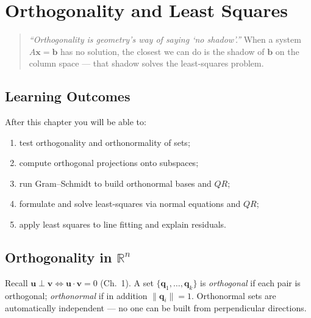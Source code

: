 \chapter{Orthogonality and Least Squares}
\label{ch:orthogonality}

\begin{quote}
\emph{``Orthogonality is geometry's way of saying `no shadow'.''} When a system $A\mathbf{x}=\mathbf{b}$ has no solution, the closest we can do is the shadow of $\mathbf{b}$ on the column space --- that shadow solves the least-squares problem.
\end{quote}

\noindent{}
\vspace{0.4em}

\section*{Learning Outcomes}
After this chapter you will be able to:
\begin{enumerate}[label=(L\arabic*)]
    \item test orthogonality and orthonormality of sets;
    \item compute orthogonal projections onto subspaces;
    \item run Gram--Schmidt to build orthonormal bases and $QR$;
    \item formulate and solve least-squares via normal equations and $QR$;
    \item apply least squares to line fitting and explain residuals.
\end{enumerate}

\section{Orthogonality in \texorpdfstring{$\mathbb{R}^n$}{Rn}}
\label{sec:ortho-def}
Recall $\mathbf{u}\perp\mathbf{v}\iff\mathbf{u}\cdot\mathbf{v}=0$ (Ch.~1). A set $\{\mathbf{q}_1,\dots,\mathbf{q}_k\}$ is \emph{orthogonal} if each pair is orthogonal; \emph{orthonormal} if in addition $\|\mathbf{q}_i\|=1$. Orthonormal sets are automatically independent --- no one can be built from perpendicular directions.

